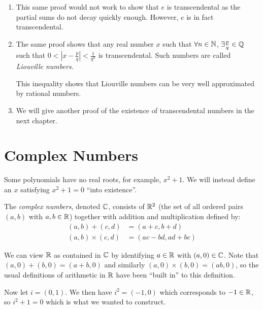 \documentclass[../main.tex]{subfiles}
\begin{document}
\begin{remark}[Remarks]
  \begin{enumerate}
    \item This same proof would not work to show that $e$ is transcendental as the partial sums do not decay quickly enough.
      However, $e$ is in fact transcendental.
    \item The same proof shows that any real number $x$ such that $\forall n \in \mathbb{N}$, $\exists \frac{p}{q} \in \mathbb{Q}$ such that $0 < |x - \frac{p}{q}| < \frac{1}{q^{n}}$ is transcendental.
      Such numbers are called \textit{Liouville numbers}.

      This inequality shows that Liouville numbers can be very well approximated by rational numbers.
    \item We will give another proof of the existence of transcendental numbers in the next chapter.
  \end{enumerate}
\end{remark}
\section{Complex Numbers}
Some polynomials have no real roots, for example, $x^2 + 1$.
We will instead define an $x$ satisfying $x^2 + 1 = 0$ ``into existence''.

\begin{definition}
  The \textit{complex numbers}, denoted $\mathbb{C}$, consists of $\mathbb{R}^2$ (the set of all ordered pairs $(a, b)$ with $a, b \in \mathbb{R}$) together with addition and multiplication defined by:
  \begin{align*}
    (a, b) + (c, d) &= (a + c, b + d) \\
    (a, b) \times (c, d) &= (ac - bd, ad + bc)
  \end{align*}
\end{definition}
We can view $\mathbb{R}$ as contained in $\mathbb{C}$ by identifying $a \in \mathbb{R}$ with $(a, 0) \in \mathbb{C}$.
Note that $(a, 0) + (b, 0) = (a + b, 0)$ and similarly $(a, 0) \times (b, 0) = (ab, 0)$, so the usual definitions of arithmetic in $\mathbb{R}$ have been ``built in'' to this definition.

Now let $i = (0, 1)$.
We then have $i^2 = (-1, 0)$ which corresponds to $-1 \in \mathbb{R}$, so $i^2 + 1 = 0$ which is what we wanted to construct.
\end{document}
